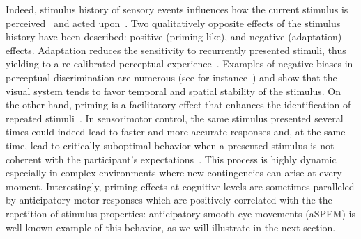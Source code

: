\documentclass[12pt,english]{article}%
\newcommand{\citep}[1]{\parencite{#1}}
\newcommand{\citet}[1]{\textcite{#1}}
\newcommand{\AM}[1]{\textbf{\textcolor{blue}{[AM: #1]}}}
\begin{document}
Indeed, stimulus history of sensory events influences
how the current stimulus is perceived~\citep{Sotiropoulos2011,Adams12,ChopinMamassian2012,FischerWhitney2014,Cicchini_PRSB_2018} and
acted upon~\citep{WallmanFuchs1998,Carpenter1995, Maus2015,Damasse18}.
Two qualitatively opposite effects of the stimulus history have been described: positive (priming-like), and negative (adaptation) effects.
Adaptation reduces the sensitivity to recurrently presented stimuli,
thus yielding to a re-calibrated perceptual experience~\citep{Clifford2007, Webster2011, Kohn2007}. Examples of negative biases in perceptual discrimination are numerous (see for instance~\citet{KanaiVerstraten2005,ChopinMamassian2012}) and show that the visual system tends
to favor temporal and spatial stability of the stimulus.
On the other hand, priming is a facilitatory effect that
enhances the identification of repeated stimuli~\citep{Verstraten1994, Tiest2009}.
In sensorimotor control,
the same stimulus presented several times could indeed
lead to faster and more accurate responses and,
at the same time, lead to critically suboptimal behavior
when a presented stimulus is not coherent
with the participant's expectations~\citep{Hyman1953, Yu2009}. This process is highly dynamic especially in complex environments
where new contingencies can arise at every moment.
Interestingly, priming effects at cognitive levels
are sometimes paralleled by anticipatory motor responses which are positively correlated with the the repetition of stimulus properties: anticipatory smooth eye movements (aSPEM) is well-known example of this behavior, as we will illustrate in the next section.
\end{document}
